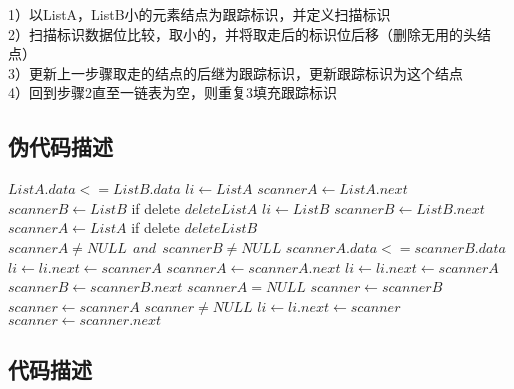\documentclass{article}
\begin{document}
1）以ListA，ListB小的元素结点为跟踪标识，并定义扫描标识\\
2）扫描标识数据位比较，取小的，并将取走后的标识位后移（删除无用的头结点）\\
3）更新上一步骤取走的结点的后继为跟踪标识，更新跟踪标识为这个结点\\
4）回到步骤2直至一链表为空，则重复3填充跟踪标识\\

\subsection{伪代码描述}



\begin{codebox}

\li \If $ ListA.data <= ListB.data $
\li 	\Then 
\li 		$ li \gets ListA$
\li 		$ scannerA \gets ListA.next $
\li 		$ scannerB \gets ListB $
\li 		\Comment if delete 
\li 		$ delete ListA$		
\li 	\Else
\li 		$ li \gets ListB $
\li 		$ scannerB \gets ListB.next $
\li 		$ scannerA \gets ListA $
\li 		\Comment if delete 
\li 		$ delete ListB$		
	\End
\li \While $ scannerA \neq NULL\ \ and \ \ scannerB \neq NULL $
\li 	\Do
\li 	\If $ scannerA.data <= scannerB.data $
\li 		\Then 
\li 			$ li \gets li.next \gets scannerA $
\li 			$ scannerA \gets scannerA.next $
\li 		\Else
\li 			$ li \gets li.next \gets scannerA  $
\li 			$ scannerB \gets scannerB.next $
		\End
	\End
\li \If $ scannerA = NULL $
\li 	\Then 
\li 		$ scanner \gets scannerB $
\li 	\Else
\li 		$ scanner \gets scannerA $
	\End	
\li \While $ scanner \neq NULL $
\li 	\Do
\li 		$ li \gets li.next \gets scanner $
\li 		$ scanner \gets scanner.next $
\end{codebox}



\subsection{代码描述}
\end{document}
